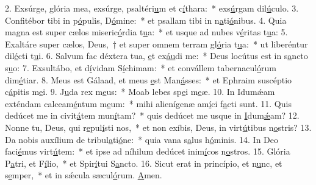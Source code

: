 2. Exsúrge, glória mea, exsúrge, psaltéri\uline{u}m et c\uline{í}thara:~* exs\uline{ú}rgam dil\uline{ú}culo.
3. Confitébor tibi in p\uline{ó}pulis, D\uline{ó}mine:~* et psallam tibi in n\uline{a}ti\uline{ó}nibus.
4. Quia magna est super cælos miseric\uline{ó}rdia t\uline{u}a:~* et usque ad nubes v\uline{é}ritas t\uline{u}a:
5. Exaltáre super cælos, Deus,~† et super omnem terram gl\uline{ó}ria t\uline{u}a:~* ut liberéntur dil\uline{é}cti t\uline{u}i.
6. Salvum fac déxtera tua, \uline{e}t ex\uline{áu}di me:~* Deus locútus est in s\uline{a}ncto s\uline{u}o:
7. Exsultábo, et d\uline{í}vidam S\uline{í}chimam:~* et convállem tabernacul\uline{ó}rum dim\uline{é}tiar.
8. Meus est Gálaad, et meus \uline{e}st Man\uline{á}sses:~* et Ephraim suscéptio c\uline{á}pitis m\uline{e}i.
9. J\uline{u}da rex m\uline{e}us:~* Moab lebes sp\uline{e}i m\uline{e}æ.
10. In Idumǽam exténdam calceam\uline{é}ntum m\uline{e}um:~* mihi alienígenæ am\uline{í}ci f\uline{a}cti sunt.
11. Quis dedúcet me in civit\uline{á}tem mun\uline{í}tam?~* quis dedúcet me usque in \uline{I}dum\uline{ǽ}am?
12. Nonne tu, Deus, qui r\uline{e}pul\uline{í}sti nos,~* et non exíbis, Deus, in virt\uline{ú}tibus n\uline{o}stris?
13. Da nobis auxílium de tribul\uline{a}ti\uline{ó}ne:~* quia vana s\uline{a}lus h\uline{ó}minis.
14. In Deo faci\uline{é}mus virt\uline{ú}tem:~* et ipse ad níhilum dedúcet inim\uline{í}cos n\uline{o}stros.
15. Glória P\uline{a}tri, et F\uline{í}lio,~* et Spir\uline{í}tui S\uline{a}ncto.
16. Sicut erat in princípio, et n\uline{u}nc, et s\uline{e}mper,~* et in sǽcula sæcul\uline{ó}rum. \uline{A}men.
